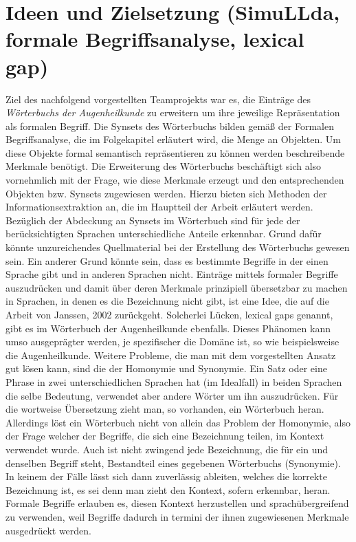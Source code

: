 \documentclass[pagesize,DIV=calc,12pt,draft]{scrreprt}
\begin{document}
\section{Ideen und Zielsetzung (SimuLLda, formale Begriffsanalyse, lexical gap)}

Ziel des nachfolgend vorgestellten Teamprojekts war es, die Einträge des \emph{Wörterbuchs der Augenheilkunde} zu erweitern um ihre jeweilige Repräsentation als formalen Begriff. 
Die Synsets des Wörterbuchs bilden gemäß der Formalen Begriffsanalyse, die im Folgekapitel erläutert wird, die Menge an Objekten. 
Um diese Objekte formal semantisch repräsentieren zu können werden beschreibende Merkmale benötigt. 
Die Erweiterung des Wörterbuchs beschäftigt sich also vornehmlich mit der Frage, wie diese Merkmale erzeugt und den entsprechenden Objekten bzw. 
Synsets zugewiesen werden. 
Hierzu bieten sich Methoden der Informationsextraktion an, die im Hauptteil der Arbeit erläutert werden. 
Bezüglich der Abdeckung an Synsets im Wörterbuch sind für jede der berücksichtigten Sprachen unterschiedliche Anteile erkennbar. 
Grund dafür könnte unzureichendes Quellmaterial bei der Erstellung des Wörterbuchs gewesen sein. 
Ein anderer Grund könnte sein, dass es bestimmte Begriffe in der einen Sprache gibt und in anderen Sprachen nicht. 
Einträge mittels formaler Begriffe auszudrücken und damit über deren Merkmale prinzipiell übersetzbar zu machen in Sprachen, in denen es die Bezeichnung nicht gibt, ist eine Idee, die auf die Arbeit von Janssen, 2002 zurückgeht. 
Solcherlei Lücken, lexical gaps genannt, gibt es im Wörterbuch der Augenheilkunde ebenfalls. 
Dieses Phänomen kann umso ausgeprägter werden, je spezifischer die Domäne ist, so wie beispielsweise die Augenheilkunde. 
Weitere Probleme, die man mit dem vorgestellten Ansatz gut lösen kann, sind die der Homonymie und Synonymie. 
Ein Satz oder eine Phrase in zwei unterschiedlichen Sprachen hat (im Idealfall) in beiden Sprachen die selbe Bedeutung, verwendet aber andere Wörter um ihn auszudrücken. 
Für die wortweise Übersetzung zieht man, so vorhanden, ein Wörterbuch heran. 
Allerdings löst ein Wörterbuch nicht von allein das Problem der Homonymie, also der Frage welcher der Begriffe, die sich eine Bezeichnung teilen, im Kontext verwendet wurde. 
Auch ist nicht zwingend jede Bezeichnung, die für ein und denselben Begriff steht, Bestandteil eines gegebenen Wörterbuchs (Synonymie). 
In keinem der Fälle lässt sich dann zuverlässig ableiten, welches die korrekte Bezeichnung ist, es sei denn man zieht den Kontext, sofern erkennbar, heran. 
Formale Begriffe erlauben es, diesen Kontext herzustellen und sprachübergreifend zu verwenden, weil Begriffe dadurch in termini der ihnen zugewiesenen Merkmale ausgedrückt werden. 
\end{document}
